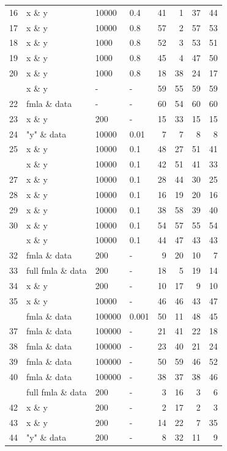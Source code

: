 \begin{Schunk}
\begin{table}
\begin{tabular}[t]{rlllrrrr}
16 & x \& y & 10000 & 0.4 & 41 & 1 & 37 & 44\\
17 & x \& y & 10000 & 0.8 & 57 & 2 & 57 & 53\\
18 & x \& y & 1000 & 0.8 & 52 & 3 & 53 & 51\\
19 & x \& y & 1000 & 0.8 & 45 & 4 & 47 & 50\\
20 & x \& y & 1000 & 0.8 & 18 & 38 & 24 & 17\\
\addlinespace
21 & x \& y & - & - & 59 & 55 & 59 & 59\\
22 & fmla \& data & - & - & 60 & 54 & 60 & 60\\
23 & x \& y & 200 & - & 15 & 33 & 15 & 15\\
24 & "y" \& data & 10000 & 0.01 & 7 & 7 & 8 & 8\\
25 & x \& y & 10000 & 0.1 & 48 & 27 & 51 & 41\\
\addlinespace
26 & x \& y & 10000 & 0.1 & 42 & 51 & 41 & 33\\
27 & x \& y & 10000 & 0.1 & 28 & 44 & 30 & 25\\
28 & x \& y & 10000 & 0.1 & 16 & 19 & 20 & 16\\
29 & x \& y & 10000 & 0.1 & 38 & 58 & 39 & 40\\
30 & x \& y & 10000 & 0.1 & 54 & 57 & 55 & 54\\
\addlinespace
31 & x \& y & 10000 & 0.1 & 44 & 47 & 43 & 43\\
32 & fmla \& data & 200 & - & 9 & 20 & 10 & 7\\
33 & full fmla \& data & 200 & - & 18 & 5 & 19 & 14\\
34 & x \& y & 200 & - & 10 & 17 & 9 & 10\\
35 & x \& y & 10000 & - & 46 & 46 & 43 & 47\\
\addlinespace
36 & fmla \& data & 100000 & 0.001 & 50 & 11 & 48 & 45\\
37 & fmla \& data & 100000 & - & 21 & 41 & 22 & 18\\
38 & fmla \& data & 100000 & - & 23 & 40 & 21 & 24\\
39 & fmla \& data & 100000 & - & 50 & 59 & 46 & 52\\
40 & fmla \& data & 100000 & - & 38 & 37 & 38 & 46\\
\addlinespace
41 & full fmla \& data & 200 & - & 3 & 16 & 3 & 6\\
42 & x \& y & 200 & - & 2 & 17 & 2 & 3\\
43 & x \& y & 200 & - & 14 & 22 & 7 & 35\\
44 & "y" \& data & 200 & - & 8 & 32 & 11 & 9\\

\end{tabular}
\end{table}
\end{Schunk}
